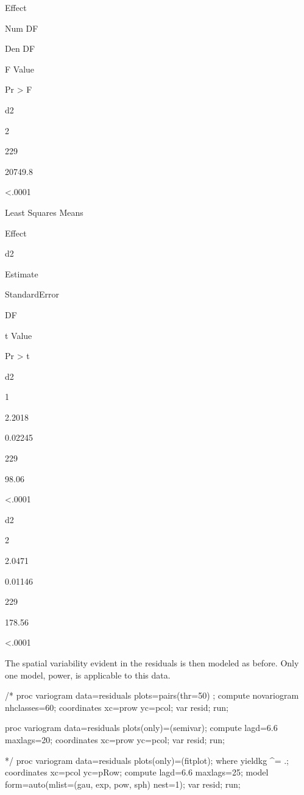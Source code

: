 \documentclass[
]{book}
\newenvironment{Shaded}{\begin{snugshade}}{\end{snugshade}}
\newcommand{\NormalTok}[1]{#1}
\begin{document}
Effect

Num DF

Den DF

F Value

Pr \textgreater{} F

d2

2

229

20749.8

\textless.0001

Least Squares Means

Effect

d2

Estimate

StandardError

DF

t Value

Pr \textgreater{} \textbar t\textbar{}

d2

1

2.2018

0.02245

229

98.06

\textless.0001

d2

2

2.0471

0.01146

229

178.56

\textless.0001

The spatial variability evident in the residuals is then modeled as before. Only one model, power, is applicable to this data.

\begin{Shaded}
\begin{Highlighting}[]
\NormalTok{/*}
\NormalTok{proc variogram data=residuals plots=pairs(thr=50) ;}
\NormalTok{   compute novariogram nhclasses=60;}
\NormalTok{   coordinates xc=prow yc=pcol;}
\NormalTok{   var resid;}
\NormalTok{run;}

\NormalTok{proc variogram data=residuals plots(only)=(semivar);}
\NormalTok{   compute lagd=6.6 maxlags=20;}
\NormalTok{   coordinates xc=prow yc=pcol;}
\NormalTok{   var resid;}
\NormalTok{run;}

\NormalTok{*/}
\NormalTok{proc variogram data=residuals plots(only)=(fitplot);}
\NormalTok{   where yieldkg \^{}= .;}
\NormalTok{   coordinates xc=pcol yc=pRow;}
\NormalTok{   compute lagd=6.6 maxlags=25;}
\NormalTok{   model form=auto(mlist=(gau, exp, pow, sph) nest=1);}
\NormalTok{  var resid;}
\NormalTok{run;}
\end{Highlighting}
\end{Shaded}
\end{document}
